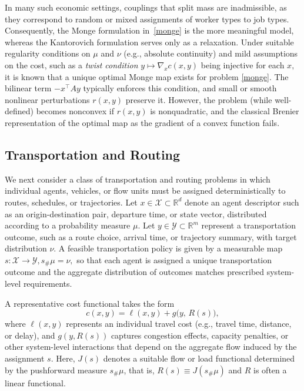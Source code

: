 \documentclass[12pt,leqno]{amsart}
\begin{document}
In many such economic settings, couplings that split mass are inadmissible, as they correspond to random or mixed assignments of worker types to job types. Consequently, the Monge formulation in~\eqref{monge} is the more meaningful model, whereas the Kantorovich formulation serves only as a relaxation. Under suitable regularity conditions on $\mu$ and $\nu$ (e.g., absolute continuity) and mild assumptions on the cost, such as a \emph{twist condition} $y \mapsto \nabla_x c(x,y)$ being injective for each $x,$ it is known that a unique optimal Monge map exists for problem \eqref{monge}. The bilinear term $-x^\top A y$ typically enforces this condition, and small or smooth nonlinear perturbations $r(x,y)$ preserve it. However, the problem (while well-defined) becomes nonconvex if $r(x,y)$ is nonquadratic, and the classical Brenier representation of the optimal map as the gradient of a convex function fails.

\subsection{Transportation and Routing}
\label{sec:transport_monge_example}

We next consider a class of transportation and routing problems in which individual agents, vehicles, or flow units must be assigned deterministically to routes, schedules, or trajectories. Let $x \in \mathcal{X} \subset \mathbb R^d$ denote an agent descriptor such as an origin-destination pair, departure time, or state vector, distributed according to a probability measure $\mu$. Let $y \in \mathcal{Y} \subset \mathbb R^m$ represent a transportation outcome, such as a route choice, arrival time, or trajectory summary, with target distribution $\nu$. A feasible transportation policy is given by a measurable map $s : \mathcal{X} \to \mathcal{Y}, s_\# \mu = \nu,$ so that each agent is assigned a unique transportation outcome and the aggregate distribution of outcomes matches prescribed system-level requirements.

A representative cost functional takes the form
\begin{equation}
\label{eq:transport_cost}
c(x,y)
=
\ell(x,y)
+
g\bigl(y,\,R(s)\bigr),
\end{equation}
where $\ell(x,y)$ represents an individual travel cost (e.g., travel time, distance, or delay), and $g(y,R(s))$ captures congestion effects, capacity penalties, or other system-level interactions that depend on the aggregate flow induced by the assignment $s$. Here, $J(s)$ denotes a suitable flow or load functional determined by the pushforward measure $s_\#\mu$, that is, $R(s) \equiv J(s_\#\mu)$ and $R$ is often a linear functional.
\end{document}
